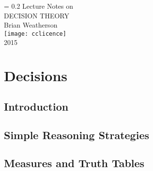 \documentclass[openany]{book}
\begin{document}
\frontmatter
{\pagestyle{plain}
\fancyhf{}
\markboth{ }{}

\newlength{\drop}%
{\begingroup%
\drop = 0.2\textheight
\centering
\vfill
{\Huge Lecture Notes on}\\[\baselineskip]
{\Huge DECISION THEORY}\\[\baselineskip]
{\large Brian Weatherson}\\[0.5\drop]
\vfill
\texttt{[image: cclicence]} \\
{\large\scshape 2015}\par
\vfill\null
\endgroup}

\setcounter{tocdepth}{1}
\tableofcontents
\cleardoublepage}

\mainmatter

\part{Decisions}

\chapter{Introduction}


\chapter{Simple Reasoning Strategies}


%

\chapter{Measures and Truth Tables}


%
\end{document}
